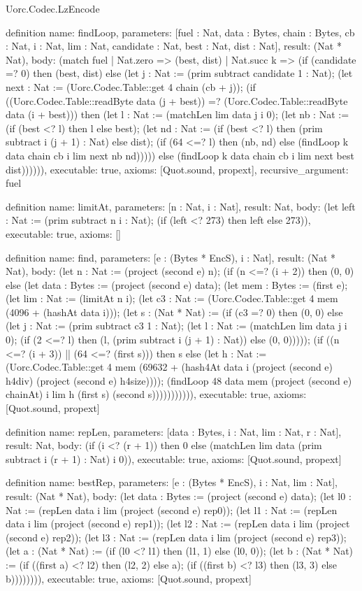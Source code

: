 \begin{lexlean}{Uorc.Codec.LzEncode}
\begin{semanticmodule}
definition{
  name: findLoop,
  parameters: [fuel : Nat, data : Bytes, chain : Bytes, cb : Nat, i : Nat, lim : Nat, candidate : Nat, best : Nat, dist : Nat],
  result: (Nat * Nat),
  body: (match fuel
    | Nat.zero => (best, dist)
    | Nat.succ k => (if (candidate =? 0) then (best, dist) else (let j : Nat := (prim subtract candidate 1 : Nat); (let next : Nat := (Uorc.Codec.Table::get 4 chain (cb + j)); (if ((Uorc.Codec.Table::readByte data (j + best)) =? (Uorc.Codec.Table::readByte data (i + best))) then (let l : Nat := (matchLen lim data j i 0); (let nb : Nat := (if (best <? l) then l else best); (let nd : Nat := (if (best <? l) then (prim subtract i (j + 1) : Nat) else dist); (if (64 <=? l) then (nb, nd) else (findLoop k data chain cb i lim next nb nd))))) else (findLoop k data chain cb i lim next best dist)))))),
  executable: true,
  axioms: [Quot.sound, propext],
  recursive_argument: fuel
}

definition{
  name: limitAt,
  parameters: [n : Nat, i : Nat],
  result: Nat,
  body: (let left : Nat := (prim subtract n i : Nat); (if (left <? 273) then left else 273)),
  executable: true,
  axioms: []
}

definition{
  name: find,
  parameters: [e : (Bytes * EncS), i : Nat],
  result: (Nat * Nat),
  body: (let n : Nat := (project (second e) n); (if (n <=? (i + 2)) then (0, 0) else (let data : Bytes := (project (second e) data); (let mem : Bytes := (first e); (let lim : Nat := (limitAt n i); (let c3 : Nat := (Uorc.Codec.Table::get 4 mem (4096 + (hashAt data i))); (let s : (Nat * Nat) := (if (c3 =? 0) then (0, 0) else (let j : Nat := (prim subtract c3 1 : Nat); (let l : Nat := (matchLen lim data j i 0); (if (2 <=? l) then (l, (prim subtract i (j + 1) : Nat)) else (0, 0))))); (if ((n <=? (i + 3)) || (64 <=? (first s))) then s else (let h : Nat := (Uorc.Codec.Table::get 4 mem (69632 + (hash4At data i (project (second e) h4div) (project (second e) h4size)))); (findLoop 48 data mem (project (second e) chainAt) i lim h (first s) (second s))))))))))),
  executable: true,
  axioms: [Quot.sound, propext]
}

definition{
  name: repLen,
  parameters: [data : Bytes, i : Nat, lim : Nat, r : Nat],
  result: Nat,
  body: (if (i <? (r + 1)) then 0 else (matchLen lim data (prim subtract i (r + 1) : Nat) i 0)),
  executable: true,
  axioms: [Quot.sound, propext]
}

definition{
  name: bestRep,
  parameters: [e : (Bytes * EncS), i : Nat, lim : Nat],
  result: (Nat * Nat),
  body: (let data : Bytes := (project (second e) data); (let l0 : Nat := (repLen data i lim (project (second e) rep0)); (let l1 : Nat := (repLen data i lim (project (second e) rep1)); (let l2 : Nat := (repLen data i lim (project (second e) rep2)); (let l3 : Nat := (repLen data i lim (project (second e) rep3)); (let a : (Nat * Nat) := (if (l0 <? l1) then (l1, 1) else (l0, 0)); (let b : (Nat * Nat) := (if ((first a) <? l2) then (l2, 2) else a); (if ((first b) <? l3) then (l3, 3) else b)))))))),
  executable: true,
  axioms: [Quot.sound, propext]
}


\end{semanticmodule}
\end{lexlean}
